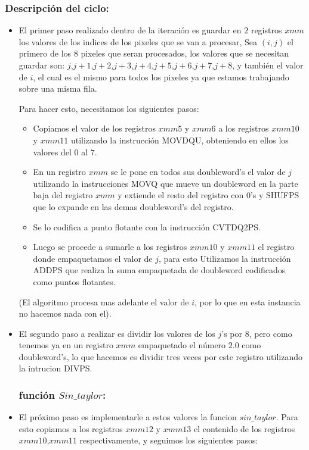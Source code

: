 \subsubsection{Descripción del ciclo:}
\begin{itemize}
	\item El primer paso realizado dentro de la iteración es guardar en $2$ registros $xmm$ los valores de los indices de los pixeles que se van a procesar, Sea $(i,j)$ el primero de los $8$ pixeles que seran procesados, los valores que se necesitan guardar son: $j$,$j+1$,$j+2$,$j+3$,$j+4$,$j+5$,$j+6$,$j+7$,$j+8$, y también el valor de $i$, el cual es el mismo para todos los pixeles ya que estamos trabajando sobre una misma fila.
	
	Para hacer esto, necesitamos los siguientes pasos:
	\begin{itemize}
	 	\item Copiamos el valor de los registros $xmm5$ y $xmm6$ a los registros $xmm10$ y $xmm11$ utilizando la instrucción MOVDQU, obteniendo en ellos los valores del $0$ al $7$.
	 	\item En un registro $xmm$ se le pone en todos sus doubleword's el valor de $j$ utilizando la instrucciones MOVQ que mueve un doubleword en la parte baja del registro $xmm$ y extiende el resto del registro con $0$'s y SHUFPS que lo expande en las demas doubleword's del registro. 
	 	\item Se lo codifica a punto flotante con la instrucción CVTDQ2PS. 
	 	\item Luego se procede a sumarle a los registros $xmm10$ y $xmm11$ el registro donde empaquetamos el valor de $j$, para esto Utilizamos la instrucción ADDPS que realiza la suma empaquetada de doubleword codificados como puntos flotantes.
	\end{itemize}
	
	(El algoritmo procesa mas adelante el valor de $i$, por lo que en esta instancia no hacemos nada con el).

	\item El segundo paso a realizar es dividir los valores de los $j$'s por $8$, pero como tenemos ya en un registro $xmm$ empaquetado el número $2.0$ como doubleword's, lo que hacemos es dividir tres veces por este registro utilizando la intrucion DIVPS.

	\subsubsection{función $Sin\_taylor$:}
	\item  El próximo paso es implementarle a estos valores la funcion $sin\_taylor$. Para esto copiamos a los registros $xmm12$ y $xmm13$ el contenido de los registros $xmm10$,$xmm11$ respectivamente, y seguimos los siguientes pasos:


\end{itemize}
